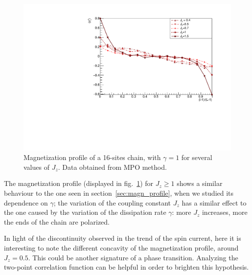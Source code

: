 \begin{figure}[H]
    \centering
    \includegraphics[scale=0.75]{Figures/16sites/16sites_LMvsJz.pdf}
    \captionsetup{width=1.\linewidth}
    \caption{Magnetization profile of a 16-sites chain, with $\gamma = 1$ for several values of $J_z$. Data obtained from MPO method.}
    \label{fig:16sites_LMvsJz}
\end{figure}

The magnetization profile (displayed in fig.~\ref{fig:16sites_LMvsJz}) for $J_z \geq 1$ shows a similar behaviour to the one seen in section~\ref{sec:magn_profile}, when we studied its dependence on $\gamma$; the variation of the coupling constant $J_z$ has a similar effect to the one caused by the variation of the dissipation rate $\gamma$: more $J_z$ increases, more the ends of the chain are polarized.

In light of the discontinuity observed in the trend of the spin current, here it is interesting to note the different concavity of the magnetization profile, around $J_z = 0.5$. This could be another signature of a phase transition. Analyzing the two-point correlation function can be helpful in order to brighten this hypothesis.



